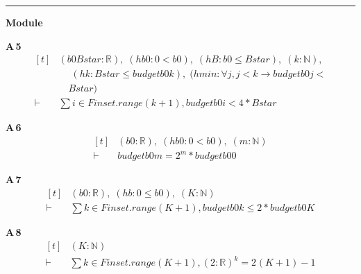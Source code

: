 \vspace{4pt}\noindent\rule{\columnwidth}{0.4pt}\par\vspace{2pt}
\noindent\textbf{Module }\par\vspace{3pt}

\noindent\textbf{A\,5}\quad{}
{\footnotesize\[ \begin{aligned}[t]
&(\mathit{b0} \mathit{Bstar} : \mathbb{R} ),\; (\mathit{hb0} : 0 < \mathit{b0}),\; (\mathit{hB} : \mathit{b0} \leq \mathit{Bstar}),\; (\mathit{k} : \mathbb{N} ),\\
&\quad \; (\mathit{hk} : \mathit{Bstar} \leq \mathit{budget} \mathit{b0} \mathit{k}),\; (\mathit{hmin} : \forall \mathit{j}, \mathit{j} < \mathit{k} \to \mathit{budget} \mathit{b0} \mathit{j} <\\
&\quad \mathit{Bstar})\\
\vdash\;&\textstyle\sum \mathit{i} \in \mathit{Finset}.\mathit{range} (\mathit{k} + 1), \mathit{budget} \mathit{b0} \mathit{i} < 4 * \mathit{Bstar}
\end{aligned} \]}

\noindent\textbf{A\,6}\quad{}
{\footnotesize\[ \begin{aligned}[t]
&(\mathit{b0} : \mathbb{R} ),\; (\mathit{hb0} : 0 < \mathit{b0}),\; (\mathit{m} : \mathbb{N} )\\
\vdash\;&\mathit{budget} \mathit{b0} \mathit{m} = 2 ^{\mathit{m}} * \mathit{budget} \mathit{b0} 0
\end{aligned} \]}

\noindent\textbf{A\,7}\quad{}
{\footnotesize\[ \begin{aligned}[t]
&(\mathit{b0} : \mathbb{R} ),\; (\mathit{hb} : 0 \leq \mathit{b0}),\; (\mathit{K} : \mathbb{N} )\\
\vdash\;&\textstyle\sum \mathit{k} \in \mathit{Finset}.\mathit{range} (\mathit{K} + 1), \mathit{budget} \mathit{b0} \mathit{k} \leq 2 * \mathit{budget} \mathit{b0} \mathit{K}
\end{aligned} \]}

\noindent\textbf{A\,8}\quad{}
{\footnotesize\[ \begin{aligned}[t]
&(\mathit{K} : \mathbb{N} )\\
\vdash\;&\textstyle\sum \mathit{k} \in \mathit{Finset}.\mathit{range} (\mathit{K} + 1), (2:\mathbb{R} ) ^{\mathit{k}} = 2 ^{} (\mathit{K} + 1) - 1
\end{aligned} \]}

